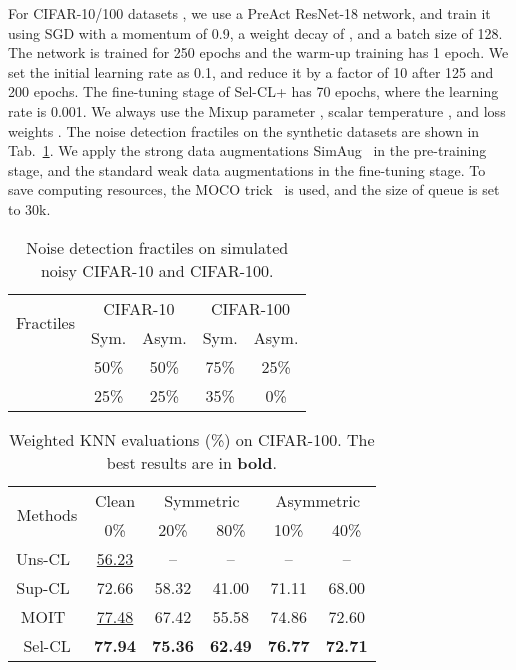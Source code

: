 \documentclass[10pt,twocolumn,letterpaper]{article}
\begin{document}
For CIFAR-10/100 datasets , we use a PreAct ResNet-18 network, and train it using SGD with a momentum of 0.9, a weight decay of , and a batch size of 128. The network is trained for 250 epochs and the warm-up training has 1 epoch. We set the initial learning rate as 0.1, and reduce it by a factor of 10 after 125 and 200 epochs. The fine-tuning stage of Sel-CL+ has 70 epochs, where the learning rate is 0.001. We always use the Mixup parameter , scalar temperature , and loss weights . The noise detection fractiles on the synthetic datasets are shown in Tab.~\ref{fractiles}. We apply the strong data augmentations SimAug~\cite{chen2020simple} in the pre-training stage, and the standard weak data augmentations in the fine-tuning stage. To save computing resources, the MOCO trick~\cite{He0WXG20} is used, and the size of queue is set to 30k.
\begin{table}[t]		
	\caption{Noise detection fractiles on simulated noisy CIFAR-10 and CIFAR-100.}
	\centering
	\small
	\begin{tabular}{c|c|c|c|c}
		\hline \multirow{2}{*}{Fractiles} &\multicolumn{2}{c}{ CIFAR-10} & \multicolumn{2}{|c}{CIFAR-100} \\
		\cline{2-5}
		&  Sym. & Asym.  & Sym. & Asym. \\
		\hline
		 &  50\% & 50\% & 75\% & 25\% \\
		 & 25\% & 25\% & 35\% & 0\% \\			
		\hline
	\end{tabular}
	\label{fractiles}
	\vspace{-3pt}
\end{table}

\begin{table}		
	\caption{Weighted KNN evaluations (\%) on CIFAR-100. The best results are in \textbf{bold}.}
	\centering
	\small
	\begin{tabular}{c|c|c|c|c|c}
		\hline \multirow{2}{*}{Methods} & Clean &\multicolumn{2}{c}{ Symmetric} & \multicolumn{2}{|c}{Asymmetric} \\\cline{2-6}
		& 0\% & 20\% & 80\% & 10\% & 40\% \\
		\hline
		Uns-CL~\cite{chen2020simple} & \underline{56.23} & -- & -- & -- & -- \\
		Sup-CL~\cite{Khosla2020} & 72.66 & 58.32 & 41.00 & 71.11 & 68.00 \\
		MOIT~\cite{Ortego2021} & \underline{77.48} & 67.42 & 55.58 & 74.86 & 72.60 \\
		Sel-CL & \textbf{77.94} & \textbf{75.36} & \textbf{62.49} & \textbf{76.77} & \textbf{72.71} \\				
		\hline
	\end{tabular}
	\label{knn}
	\vspace{-6pt}
\end{table}
\end{document}
